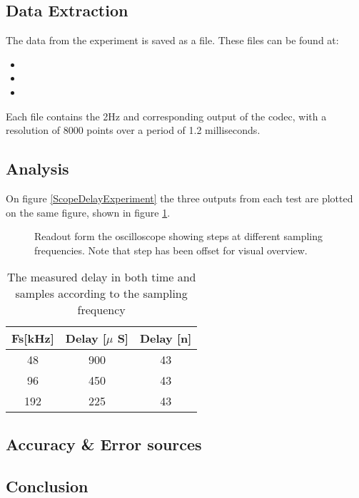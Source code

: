 \subsection{Data Extraction}

The data from the experiment is saved as a  file. These files can be found at:
\begin{itemize}
	\item {}
	\item {}
	\item {}
\end{itemize}

Each file contains the 2Hz and corresponding output of the codec, with a resolution of 8000 points over a period of 1.2 milliseconds.


\subsection{Analysis}

On figure \ref{ScopeDelayExperiment} the three outputs from each test are plotted on the same figure, shown in figure \ref{fig:ScopeDelayExperiment}.  

\begin{figure}[H]
	\centering
	
	\caption{Readout form the oscilloscope showing steps at different sampling frequencies. Note that step has been offset for visual overview.}
	\label{fig:ScopeDelayExperiment}
\end{figure}


\begin{table}[H]
	\centering
	\begin{tabular}{ccc}
		Fs[kHz] & Delay [$\mu$ S] & Delay [n] \\ \hline \hline
		48 & 900 & 43 \\ 
		96 & 450 & 43 \\ 
		192 & 225 & 43
	\end{tabular} 
	\caption{The measured delay in both time and samples according to the sampling frequency}
	\label{tab:DelayResults}
\end{table}


\subsection{Accuracy \& Error sources}




\subsection{Conclusion}





